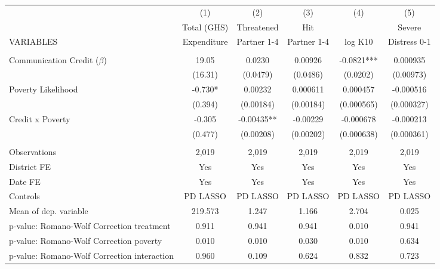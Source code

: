 \begin{tabular}{lccccc} \hline
 & (1) & (2) & (3) & (4) & (5) \\
 & Total (GHS) & Threatened & Hit &  & Severe \\
VARIABLES & Expenditure & Partner 1-4 & Partner 1-4 & log K10 & Distress 0-1 \\ \hline
 &  &  &  &  &  \\
Communication Credit ($\beta$) & 19.05 & 0.0230 & 0.00926 & -0.0821*** & 0.000935 \\
 & (16.31) & (0.0479) & (0.0486) & (0.0202) & (0.00973) \\
Poverty Likelihood & -0.730* & 0.00232 & 0.000611 & 0.000457 & -0.000516 \\
 & (0.394) & (0.00184) & (0.00184) & (0.000565) & (0.000327) \\
Credit x Poverty & -0.305 & -0.00435** & -0.00229 & -0.000678 & -0.000213 \\
 & (0.477) & (0.00208) & (0.00202) & (0.000638) & (0.000361) \\
 &  &  &  &  &  \\
Observations & 2,019 & 2,019 & 2,019 & 2,019 & 2,019 \\
District FE & Yes & Yes & Yes & Yes & Yes \\
Date FE & Yes & Yes & Yes & Yes & Yes \\
Controls & PD LASSO & PD LASSO & PD LASSO & PD LASSO & PD LASSO \\
Mean of dep. variable & 219.573 & 1.247 & 1.166 & 2.704 & 0.025 \\
p-value: Romano-Wolf Correction treatment & 0.911 & 0.941 & 0.941 & 0.010 & 0.941 \\
p-value: Romano-Wolf Correction poverty & 0.010 & 0.010 & 0.030 & 0.010 & 0.634 \\
 p-value: Romano-Wolf Correction interaction & 0.960 & 0.109 & 0.624 & 0.832 & 0.723 \\ \hline
\end{tabular}
